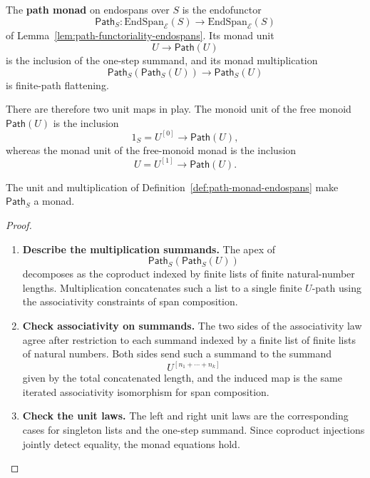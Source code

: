 \begin{definition}
\label{def:path-monad-endospans}
The \textbf{path monad} on endospans over \(S\) is the endofunctor
\[
  \mathsf{Path}_S:
  \mathrm{EndSpan}_{\mathcal E}(S)
  \longrightarrow
  \mathrm{EndSpan}_{\mathcal E}(S)
\]
of Lemma~\ref{lem:path-functoriality-endospans}. Its monad unit
\[
  U\longrightarrow\mathsf{Path}(U)
\]
is the inclusion of the one-step summand, and its monad multiplication
\[
  \mathsf{Path}_S(\mathsf{Path}_S(U))
  \longrightarrow
  \mathsf{Path}_S(U)
\]
is finite-path flattening.
\end{definition}

There are therefore two unit maps in play. The monoid unit of the free monoid
\(\mathsf{Path}(U)\) is the inclusion
\[
  1_S=U^{[0]}\longrightarrow\mathsf{Path}(U),
\]
whereas the monad unit of the free-monoid monad is the inclusion
\[
  U=U^{[1]}\longrightarrow\mathsf{Path}(U).
\]

\begin{proposition}
\label{prop:path-monad-laws}
The unit and multiplication of Definition~\ref{def:path-monad-endospans} make
\(\mathsf{Path}_S\) a monad.
\end{proposition}

\begin{proof}
\begin{enumerate}
  \item \textbf{Describe the multiplication summands.}
  The apex of
  \[
    \mathsf{Path}_S(\mathsf{Path}_S(U))
  \]
  decomposes as the coproduct indexed by finite lists of finite
  natural-number lengths. Multiplication concatenates such a list to a single
  finite \(U\)-path using the associativity constraints of span composition.

  \item \textbf{Check associativity on summands.}
  The two sides of the associativity law agree after restriction to each
  summand indexed by a finite list of finite lists of natural numbers. Both
  sides send such a summand to the summand
  \[
    U^{[n_1+\cdots+n_k]}
  \]
  given by the total concatenated length, and the induced map is the same
  iterated associativity isomorphism for span composition.

  \item \textbf{Check the unit laws.}
  The left and right unit laws are the corresponding cases for singleton
  lists and the one-step summand. Since coproduct injections jointly detect
  equality, the monad equations hold.
\end{enumerate}
\end{proof}

